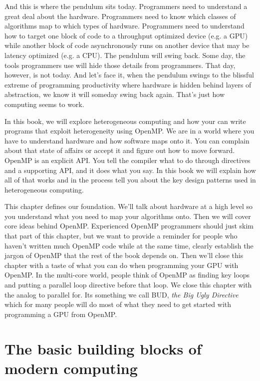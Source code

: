 And this is where the pendulum sits today.   Programmers need to understand a great deal about the hardware.  Programmers need to 
know which classes of algorithms map to which types of hardware.  Programmers need to understand how to target one block of 
code to a throughput optimized device (e.g. a GPU) while another block of code asynchronously runs on another device
that may be latency optimized (e.g. a CPU).  The pendulum will swing back.  Some day, the tools programmers use will 
hide those details from programmers.   That day, however, is not today.   And let's face it, when the pendulum swings to the
blissful extreme of programming productivity where hardware is hidden behind layers of abstraction, we know it will someday
swing back again.  That's just how computing seems to work.

In this book, we will explore heterogeneous computing and how your can write programs that exploit heterogeneity 
using OpenMP.  We are in a world where you have to understand hardware and how software maps onto it.   You can 
complain about that state of affairs or accept it and figure out how to move forward.  OpenMP is an explicit API.  You 
tell the compiler what to do through directives and a supporting API, and it does what you say.    In this book we will
explain how all of that works and in the process tell you about the key design patterns used in heterogeneous computing.

This chapter defines our foundation.  We'll talk about hardware at a high level so you understand what you need to map
your algorithms onto.  Then we will cover core ideas behind OpenMP.  Experienced OpenMP programmers should just skim
that part of this chapter, but we want to provide a reminder for people who haven't written much OpenMP code while at the
same time, clearly establish the jargon of OpenMP that the rest of the book depends on.  Then we'll close this chapter with
a taste of what you can do when programming your GPU with OpenMP.   In the multi-core world, people think of OpenMP
as finding key loops and putting a parallel loop directive before that loop.  We close this chapter with the analog to parallel for.  
Its something we call BUD, \emph{the Big Ugly Directive} which for many people will do most of what they need to get started
with programming a GPU from OpenMP.

\section{The basic building blocks of modern computing}

